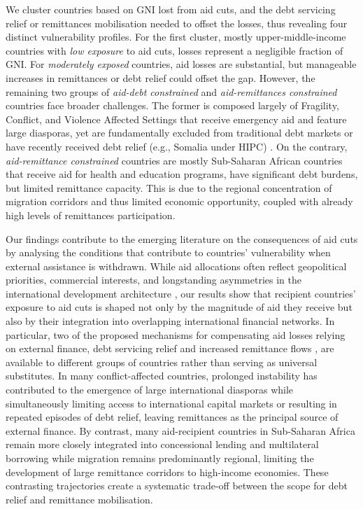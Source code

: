 \documentclass[fleqn,10pt,twocolumn]{wlscirep}
\begin{document}
{
We cluster countries based on GNI lost from aid cuts, and the debt servicing relief or remittances mobilisation needed to offset the losses, thus revealing four distinct vulnerability profiles. For the first cluster, mostly upper-middle-income countries with \textit{low exposure} to aid cuts, losses represent a negligible fraction of GNI. For \textit{moderately exposed} countries, aid losses are substantial, but manageable increases in remittances or debt relief could offset the gap. However, the remaining two groups of \textit{aid-debt constrained} and \textit{aid-remittances constrained} countries face broader challenges. The former is composed largely of Fragility, Conflict, and Violence Affected Settings \cite{worldbank2025fcs} that receive emergency aid and feature large diasporas, yet are fundamentally excluded from traditional debt markets or have recently received debt relief (e.g., Somalia under HIPC) \cite{IMF2023SomaliaDebtRelief}. On the contrary, \textit{aid-remittance constrained} countries are mostly Sub-Saharan African countries that receive aid for health and education programs, have significant debt burdens, but limited remittance capacity. This is due to the regional concentration of migration corridors and thus limited economic opportunity, coupled with already high levels of remittances participation.
}

{Our findings contribute to the emerging literature on the consequences of aid cuts \cite{gibson2025impact, bulivr2008volatility, agenor2020aid} by analysing the conditions that contribute to countries' vulnerability when external assistance is withdrawn. While aid allocations often reflect geopolitical priorities, commercial interests, and longstanding asymmetries in the international development architecture \cite{mcewan2008postcolonialism, lancaster2008foreign}, our results show that recipient countries' exposure to aid cuts is shaped not only by the magnitude of aid they receive but also by their integration into overlapping international financial networks. In particular, two of the proposed mechanisms for compensating aid losses relying on external finance, debt servicing relief \cite{miliband_2025} and increased remittance flows \cite{cgdev_remittances_aid_cuts_2025}, are available to different groups of countries rather than serving as universal substitutes. In many conflict-affected countries, prolonged instability has contributed to the emergence of large international diasporas while simultaneously limiting access to international capital markets or resulting in repeated episodes of debt relief, leaving remittances as the principal source of external finance. By contrast, many aid-recipient countries in Sub-Saharan Africa remain more closely integrated into concessional lending and multilateral borrowing while migration remains predominantly regional, limiting the development of large remittance corridors to high-income economies. These contrasting trajectories create a systematic trade-off between the scope for debt relief and remittance mobilisation.
}
\end{document}
